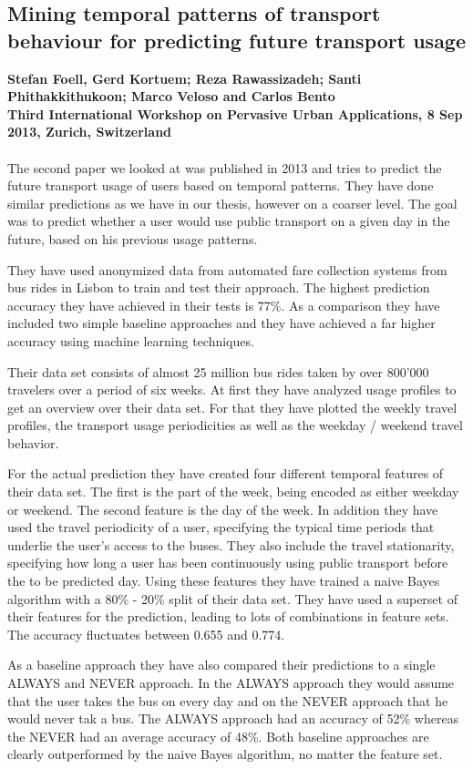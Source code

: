 \subsection{Mining temporal patterns of transport behaviour for predicting future transport usage}
\textbf{Stefan Foell, Gerd Kortuem; Reza Rawassizadeh; Santi Phithakkithukoon; Marco Veloso and Carlos Bento\\
Third International Workshop on Pervasive Urban Applications, 8 Sep 2013, Zurich, Switzerland}
\\
\\
The second paper we looked at was published in 2013 and tries to predict the future transport usage of users based on temporal patterns. They have done similar predictions as we have in our thesis, however on a coarser level. The goal was to predict whether a user would use public transport on a given day in the future, based on his previous usage patterns.

They have used anonymized data from automated fare collection systems from bus rides in Lisbon to train and test their approach. The highest prediction accuracy they have achieved in their tests is 77\%. As a comparison they have included two simple baseline approaches and they have achieved a far higher accuracy using machine learning techniques.

Their data set consists of almost 25 million bus rides taken by over 800'000 travelers over a period of six weeks. At first they have analyzed usage profiles to get an overview over their data set. For that they have plotted the weekly travel profiles, the transport usage periodicities as well as the weekday / weekend travel behavior.

For the actual prediction they have created four different temporal features of their data set. The first is the part of the week, being encoded as either weekday or weekend. The second feature is the day of the week. In addition they have used the travel periodicity of a user, specifying the typical time periods that underlie the user's access to the buses. They also include the travel stationarity, specifying how long a user has been continuously using public transport before the to be predicted day. Using these features they have trained a naive Bayes algorithm with a 80\% - 20\% split of their data set. They have used a superset of their features for the prediction, leading to lots of combinations in feature sets. The accuracy fluctuates between 0.655 and 0.774. 

As a baseline approach they have also compared their predictions to a single ALWAYS and NEVER approach. In the ALWAYS approach they would assume that the user takes the bus on every day and on the NEVER approach that he would never tak a bus. The ALWAYS approach had an accuracy of 52\% whereas the NEVER had an average accuracy of 48\%. Both baseline approaches are clearly outperformed by the naive Bayes algorithm, no matter the feature set.


